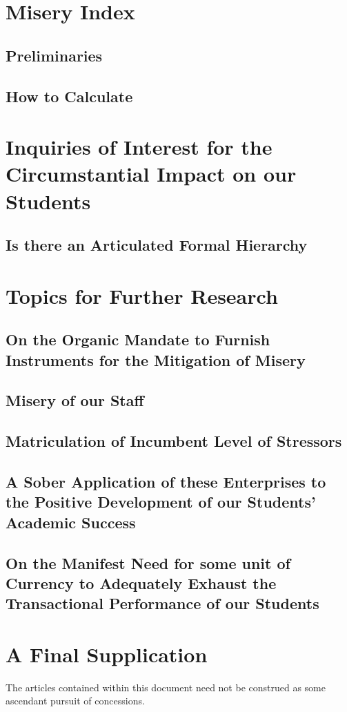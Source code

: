 \documentclass[12pt]{article}
\begin{document}
	\section{Misery Index}
	\subsection{Preliminaries}
	\subsection{How to Calculate}
	
	\section{Inquiries of Interest for the Circumstantial Impact on our Students}
	\subsection{Is there an Articulated Formal Hierarchy }
	
	\section{Topics for Further Research}
	\subsection{On the Organic Mandate to Furnish Instruments for the Mitigation of Misery}
	\subsection{Misery of our Staff}
	\subsection{Matriculation of Incumbent Level of Stressors}
	\subsection{A Sober Application of these Enterprises to the Positive Development of our Students' Academic Success}
	\subsection{On the Manifest Need for some unit of Currency to Adequately Exhaust the Transactional Performance of our Students}
	
	\section{A Final Supplication}
	The articles contained within this document need not be construed as some ascendant pursuit of concessions.
	
\end{document}
